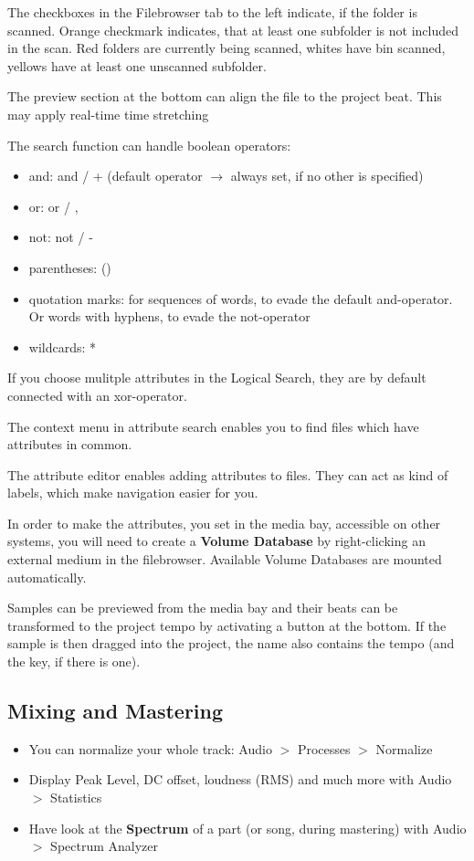 \documentclass[10pt]{article}
\begin{document}
The checkboxes in the Filebrowser tab to the left indicate, if the folder is scanned. Orange checkmark indicates, that at least one subfolder is not included in the scan. Red folders are currently being scanned, whites have bin scanned, yellows have at least one unscanned subfolder.

The preview section at the bottom can align the file to the project beat. This may apply real-time time stretching

The search function can handle boolean operators:
\begin{itemize}
	\item and: and / + (default operator $\rightarrow$ always set, if no other is specified)
	\item or: or / ,
	\item not: not / -
	\item parentheses: ()
	\item quotation marks: for sequences of words, to evade the default and-operator. Or words with hyphens, to evade the not-operator
	\item wildcards: *
\end{itemize}

If you choose mulitple attributes in the Logical Search, they are by default connected with an xor-operator.

The context menu in attribute search enables you to find files which have attributes in common.

The attribute editor enables adding attributes to files. They can act as kind of labels, which make navigation easier for you.

In order to make the attributes, you set in the media bay, accessible on other systems, you will need to create a \textbf{Volume Database} by right-clicking an external medium in the filebrowser. Available Volume Databases are mounted automatically.

Samples can be previewed from the media bay and their beats can be transformed to the project tempo by activating a button at the bottom. If the sample is then dragged into the project, the name also contains the tempo (and the key, if there is one).

\subsection{Mixing and Mastering}

\begin{itemize}
	\item You can normalize your whole track: Audio $>$ Processes $>$ Normalize
	\item Display Peak Level, DC offset, loudness (RMS) and much more with Audio $>$ Statistics
	\item Have look at the \textbf{Spectrum} of a part (or song, during mastering) with Audio $>$ Spectrum Analyzer
\end{itemize}
\end{document}

